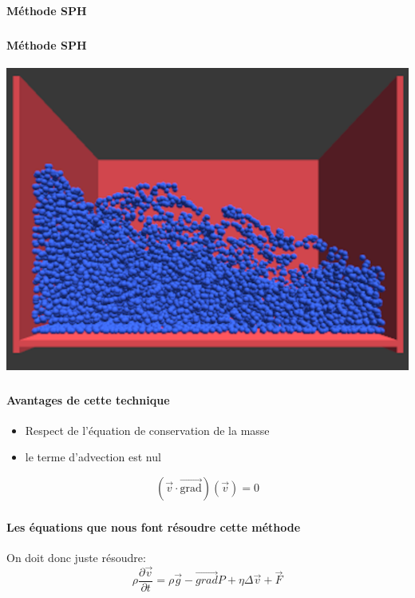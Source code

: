 \section{\sndpti}

\begin{frame}
\frametitle{\sndpti}
\framesubtitle{Méthode SPH}

\centering {\huge \sndpti}

\end{frame}


\begin{frame}
\frametitle{\sndpti}
\framesubtitle{Méthode SPH}

\centering
\includegraphics[width=.7\linewidth]{figures/sph_illustration.png}

\end{frame}

\begin{frame}
\frametitle{\sndpti}
\framesubtitle{Avantages de cette technique}

\begin{itemize}
    \item Respect de l'équation de conservation de la masse
    \item le terme d'advection est nul 
\end{itemize}
$$(\vec{v}\cdot \vec{\text{grad}}) (\vec{v}) = 0$$

\end{frame}

\begin{frame}
    \frametitle{\sndpti}
    \framesubtitle{Les équations que nous font résoudre cette méthode}
    
    On doit donc juste résoudre:
    $$
    \rho \frac{\partial \vec{v}}{\partial t}= \rho \vec{g} - \vec{grad} P + \eta \Delta \vec{v} + \vec{F}
    $$
    
\end{frame}


